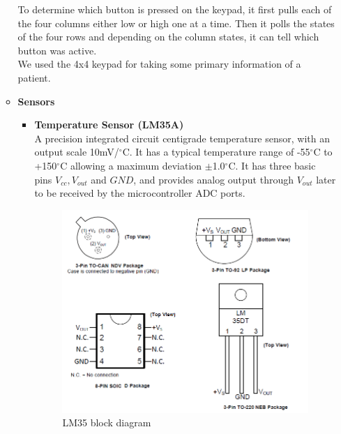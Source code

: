 \documentclass[a4paper,12pt]{article}
\begin{document}
\begin{enumerate}
\begin{itemize}
			To determine which button is pressed on the keypad, it first pulls each of the four columns either low or high one at a time. Then it polls the states of the four rows and depending on the column states, it can tell which button was active.\\
			We used the 4x4 keypad for taking some primary information of a patient.
			\item \textbf{Sensors}
			\begin{itemize}
				\item \textbf{Temperature Sensor (LM35A)} \\
				A precision integrated circuit centigrade temperature sensor, with an output scale 10mV/$^\circ$C. It has a typical temperature range of -55$^\circ$C to +150$^\circ$C allowing a maximum deviation $\pm$1.0$^\circ$C. It has three basic pins $V_{cc}, V_{out}$ and $GND$, and provides analog output through $V_{out}$ later to be received by the microcontroller ADC ports.
				\begin{figure}[H]
					\centering
					\includegraphics[scale=0.6]{imgs/lm35 pin diagram.png}
					\caption{LM35 block diagram}
				\end{figure}
				\begin{figure}[H]
					\centering

\end{figure}
\end{itemize}
\end{itemize}
\end{enumerate}
\end{document}
